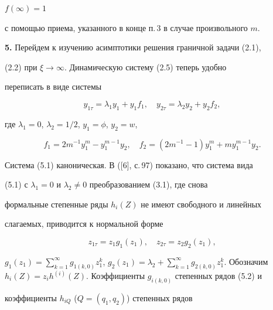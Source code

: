 $f(\infty)=1$ 


с помощью приема, указанного в конце п.\,3 в случае произвольного $m$. 


\medskip 


\addtocounter{section}{1} 


\setcounter{equation}{0}


 


{\bf 5.} Перейдем к изучению асимптотики решения граничной задачи (2.1), 


(2.2) при $\xi\to\infty$. Динамическую систему (2.5) теперь удобно 


переписать в виде системы 


\begin{equation} 


y_{1\tau}=\lambda_1y_1+y_1f_1,\quad y_{2\tau}= 


\lambda_2y_2+y_2f_2, 


\end{equation} 


где $\lambda_1=0$, $\lambda_2=1/2$, $y_1=\phi$, $y_2=w$, 


\begin{equation} 


f_1=2m^{-1}y^m_1-y^{m-1}_1y_2,\quad 


f_2=(2m^{-1}-1)y^m_1+m y^{m-1}_1y_2. 


\end{equation} 


Система (5.1) каноническая. В ([6], с.\,97) показано, что система вида 


(5.1) с $\lambda_1=0$ и $\lambda_2\ne0$ преобразованием (3.1), где снова 


формальные степенные ряды $h_i(Z)$ не имеют свободного и линейных 


слагаемых, приводится к нормальной форме 


\begin{equation} 


z_{1\tau}=z_1g_1(z_1),\quad z_{2\tau}=z_2g_2(z_1), 


\end{equation} 


$g_1(z_1)=\sum\limits^\infty_{k=1}g_{1(k,0)}z^k_1$, $g_2(z_1)=\lambda_2+ 


\sum\limits^\infty_{k=1}g_{2(k,0)}z^k_1$. Обозначим $h_i(Z)=z_i 


h^{(i)}(Z)$. Коэффициенты $g_{i(k,0)}$ степенных рядов (5.2) и 


коэффициенты $h_{iQ}$ ($Q=(q_1,q_2)$) степенных рядов 


